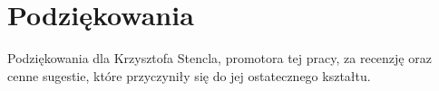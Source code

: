 \documentclass[]{einformatica}
\begin{document}
\maketitle 








\section*{Podziękowania}
Podziękowania dla Krzysztofa Stencla, promotora tej pracy, za recenzję oraz cenne sugestie, które przyczyniły się do jej ostatecznego kształtu.

 

\end{document}
